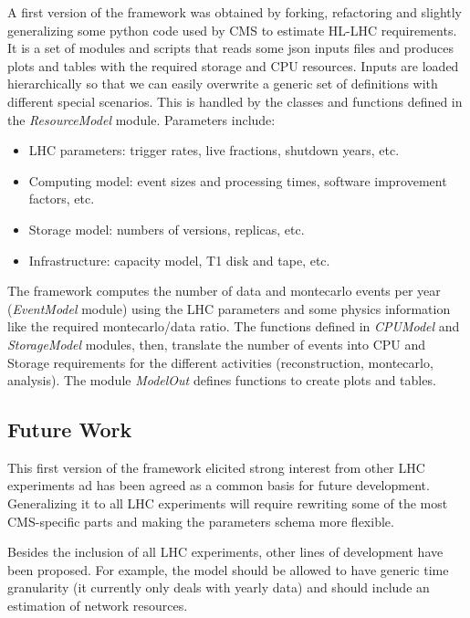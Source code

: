 A first version of the framework \cite{ourresmodel} was obtained by
forking, refactoring and slightly generalizing some python code
\cite{cmsresmodel} used by CMS to estimate HL-LHC requirements.
It is a set of modules and scripts that reads some json inputs
files and produces plots and tables with the required storage and CPU
resources. Inputs are loaded hierarchically so that we can easily
overwrite a generic set of definitions with different special
scenarios. This is handled by the classes and functions defined in the
{\it ResourceModel} module. Parameters include:
\begin{itemize}
\item LHC parameters: trigger rates, live fractions, shutdown years, etc.
\item Computing model: event sizes and processing times, software improvement factors, etc.
\item Storage model: numbers of versions, replicas, etc.
\item Infrastructure: capacity model, T1 disk and tape, etc.
\end{itemize}
The framework computes the number of data and montecarlo events
per year ({\it EventModel} module) using the LHC parameters and some
physics information like the required montecarlo/data ratio. The
functions defined in {\it CPUModel} and {\it StorageModel} modules,
then, translate the number of events into CPU and Storage requirements
for the different activities (reconstruction, montecarlo, analysis).
The module {\it ModelOut} defines functions to create plots and tables.

\subsection{Future Work}

This first version of the framework elicited strong interest from
other LHC experiments ad has been agreed as a common basis for future
development. Generalizing it to all LHC experiments will require
rewriting some of the most CMS-specific parts and making the
parameters schema more flexible.

Besides the inclusion of all LHC experiments, other lines of
development have been proposed.  For example, the model should be
allowed to have generic time granularity (it currently only deals with
yearly data) and should include an estimation of network resources.

